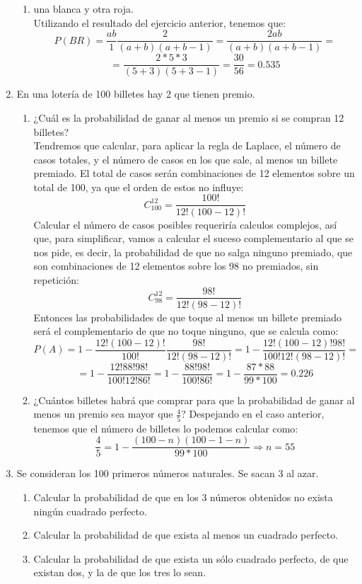 \documentclass[a4paper,12pt]{article}
\begin{document}
\begin{enumerate}
\begin{enumerate}[label=\alph*)]
    \item una blanca y otra roja.\\
    Utilizando el resultado del ejercicio anterior, tenemos que:
    $$P(BR)=\frac{ab}{1}\frac{2}{(a+b)(a+b-1)}=\frac{2ab}{(a+b)(a+b-1)}=$$
    $$=\frac{2*5*3}{(5+3)(5+3-1)}=\frac{30}{56}=0.535$$
    \end{enumerate}

\item En una lotería de 100 billetes hay 2 que tienen premio.
    \begin{enumerate}[label=\alph*)]
    \item ¿Cuál es la probabilidad de ganar al menos un premio si se compran 12 billetes?\\
    Tendremos que calcular, para aplicar la regla de Laplace, el número de casos totales, y el número de casos en los que sale, al menos un billete premiado. El total de casos serán combinaciones de 12 elementos sobre un total de 100, ya que el orden de estos no influye:
    $$C^{12}_{100}= \frac{100!}{12!(100-12)!}$$
    Calcular el número de casos posibles requeriría calculos complejos, así que, para simplificar, vamos a calcular el suceso complementario al que se nos pide, es decir, la probabilidad de que no salga ninguno premiado, que son combinaciones de 12 elementos sobre los 98 no premiados, sin repetición:
    $$C^{12}_{98}= \frac{98!}{12!(98-12)!}$$
    Entonces las probabilidades de que toque al menos un billete premiado será el complementario de que no toque ninguno, que se calcula como:
    $$P(A)=1-\frac{12!(100-12)!}{100!} \frac{98!}{12!(98-12)!}=1-\frac{12!(100-12)!98!}{100!12!(98-12)!}=$$
    $$=1-\frac{12!88!98!}{100!12!86!}=1-\frac{88!98!}{100!86!}=1-\frac{87*88}{99*100}=0.226$$
    
    \item ¿Cuántos billetes habrá que comprar para que la probabilidad de ganar al menos un premio sea mayor que \( \frac{4}{5} \)?
    Despejando en el caso anterior, tenemos que el número de billetes lo podemos calcular como: 
    $$\frac{4}{5}=1-\frac{(100-n)(100-1-n)}{99*100}\Rightarrow n=55$$
    
    \end{enumerate}
    
\item Se consideran los 100 primeros números naturales. Se sacan 3 al azar.
    \begin{enumerate}[label=\alph*)]
    \item Calcular la probabilidad de que en los 3 números obtenidos no exista ningún cuadrado perfecto.
    \item Calcular la probabilidad de que exista al menos un cuadrado perfecto.
    \item Calcular la probabilidad de que exista un sólo cuadrado perfecto, de que existan dos, y la de que los tres lo sean.
    \end{enumerate}


\end{enumerate}
\end{document}

